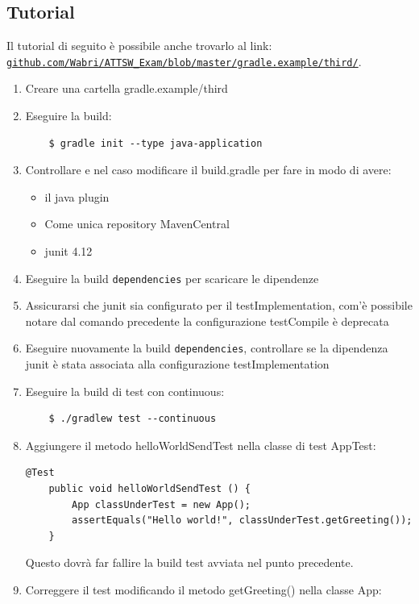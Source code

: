 \subsection{Tutorial}
Il tutorial di seguito è possibile anche trovarlo al link: \href{https://github.com/Wabri/ATTSW_Exam/blob/master/gradle.example/third/}{\texttt{github.com/Wabri/ATTSW\_Exam/blob/master/gradle.example/third/}}.
\begin{enumerate}
    \item Creare una cartella gradle.example/third
    \item Eseguire la build:
\begin{verbatim}
    $ gradle init --type java-application
\end{verbatim}
    \item Controllare e nel caso modificare il build.gradle per fare in modo di avere:
    \begin{itemize}
        \item il java plugin
        \item Come unica repository MavenCentral
        \item junit 4.12
    \end{itemize}
    \item Eseguire la build \texttt{dependencies} per scaricare le dipendenze
    \item Assicurarsi che junit sia configurato per il testImplementation, com'è possibile notare dal comando precedente la configurazione testCompile è deprecata
    \item Eseguire nuovamente la build \texttt{dependencies}, controllare se la dipendenza junit è stata associata alla configurazione testImplementation
    \item Eseguire la build di test con continuous:
    \begin{verbatim}
    $ ./gradlew test --continuous\end{verbatim}
    \item Aggiungere il metodo helloWorldSendTest nella classe di test AppTest:
    \begin{lstlisting}[frame=single]
    @Test 
    public void helloWorldSendTest () {
	    App classUnderTest = new App();
	    assertEquals("Hello world!", classUnderTest.getGreeting());
    }
    \end{lstlisting}
    Questo dovrà far fallire la build test avviata nel punto precedente.
    \item Correggere il test modificando il metodo getGreeting() nella classe App:

\end{enumerate}
